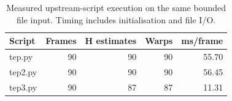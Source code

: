 \begin{table}[htbp]\centering\small
\caption{Measured upstream-script execution on the same bounded file input. Timing includes initialisation and file I/O.}\label{tab:originals}
\begin{tabular}{lrrrr}
\toprule
Script & Frames & H estimates & Warps & ms/frame \\
\midrule
tep.py & 90 & 90 & 90 & 55.70 \\
tep2.py & 90 & 90 & 90 & 56.45 \\
tep3.py & 90 & 87 & 87 & 11.31 \\
\bottomrule
\end{tabular}\end{table}
